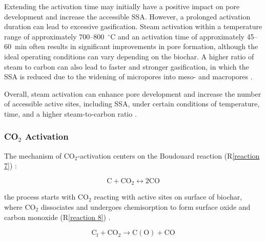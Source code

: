 \vspace{0.6em}

Extending the activation time may initially have a positive impact on pore development and increase the accessible SSA. However, a prolonged activation duration can lead to excessive gasification. Steam activation within a temperature range of approximately 700–800~$^\circ$C and an activation time of approximately 45–60~min often results in significant improvements in pore formation, although the ideal operating conditions can vary depending on the biochar. A higher ratio of steam to carbon can also lead to faster and stronger gasification, in which the SSA is reduced due to the widening of micropores into meso- and macropores \cite{Sajjadi2019}. 

\vspace{0.6em}

Overall, steam activation can enhance pore development and increase the number of accessible active sites, including SSA, under certain conditions of temperature, time, and a higher steam-to-carbon ratio \cite{Sajjadi2019}.










\subsubsection*{\textbf{CO$_2$} Activation}

The mechanism of CO$_2$-activation centers on the Boudouard reaction (R\ref{reaction 7})  \cite{Sajjadi2019}:  

\begin{equation}
\mathrm{C + CO_2 \leftrightarrow 2CO}
\label{reaction 7}
\end{equation}

the process starts with CO$_2$ reacting with active sites on surface of biochar, where CO$_2$ dissociates and undergoes chemisorption to form surface oxide and carbon monoxide (R\ref{reaction 8})  \cite{Sajjadi2019}. 

\begin{equation}
\mathrm{C_f + CO_2 \rightarrow C(O) + CO}
\label{reaction 8}
\end{equation}

